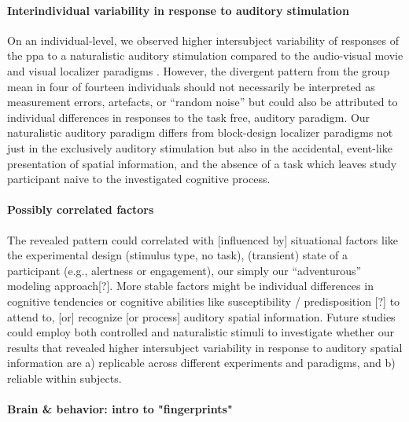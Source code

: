 \paragraph{Interindividual variability in response to auditory stimulation}

On an individual-level, we observed higher intersubject variability of responses
of the \ac{ppa} to a naturalistic auditory stimulation compared to the
audio-visual movie and visual localizer paradigms \citep[cf. Table 3
in][]{sengupta2016extension}.
However, the divergent pattern from the group mean in four of fourteen
individuals should not necessarily be interpreted as measurement errors,
artefacts, or ``random noise''  but could also be
attributed to individual differences in responses to the task free, auditory
paradigm.
%
Our naturalistic auditory paradigm differs from block-design localizer paradigms
not just in the exclusively auditory stimulation but also in the accidental,
event-like presentation of spatial information, and the absence of a task which
leaves study participant naive to the investigated cognitive process.


\paragraph{Possibly correlated factors}


%
The revealed pattern could correlated with [influenced by] situational factors
like the experimental design (stimulus type, no task), (transient) state of a
participant (e.g., alertness or engagement),  our simply our ``adventurous''
modeling approach[?].
%
%
More stable factors might be individual differences in cognitive tendencies or
cognitive abilities like susceptibility / predisposition [?] to attend to, [or]
recognize [or process] auditory spatial information.
Future studies could employ both controlled and naturalistic stimuli to
investigate whether our results that revealed higher intersubject variability in
response to auditory spatial information are a) replicable across different
experiments and paradigms, and b) reliable within subjects.


\paragraph{Brain \& behavior: intro to "fingerprints"}

